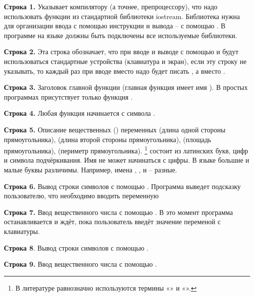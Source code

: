 \textbf{Строка 1.} Указывает компилятору (а точнее, препроцессору), что надо использовать функции из стандартной
библиотеки iostream. Библиотека  нужна для организации ввода с
помощью инструкции  и вывода – с помощью . В программе на языке  должны
быть подключены все используемые библиотеки.

\textbf{Строка 2.} Эта строка обозначает, что при вводе и выводе с помощью  и
 будут использоваться стандартные устройства (клавиатура и экран), если эту строку не указывать,
то каждый раз при вводе вместо  надо будет писать , а вместо
.

\textbf{Строка 3.} Заголовок главной функции (главная функция имеет имя ). В простых программах
присутствует только функция .

\textbf{Строка 4.} Любая функция начинается с символа \textstyleExample{\{}.

\textbf{Строка 5.} Описание вещественных () переменных  (длина одной стороны
прямоугольника),  (длина второй стороны прямоугольника),  (площадь
прямоугольника),  (периметр прямоугольника). \footnote{В 
литературе равнозначно используются термины «» и
«».} состоит из латинских букв, цифр и символа подчёркивания. Имя не может начинаться
с цифры. В языке  большие и малые буквы различимы. Например, имена ,
,  и  – разные.

\textbf{Строка 6.} Вывод строки символов  с помощью . Программа выведет
подсказку пользователю, что необходимо вводить переменную 

\textbf{Строка 7.} Ввод вещественного числа  с помощью . В это момент
программа останавливается и ждёт, пока пользователь введёт значение переменой  с клавиатуры.

\textbf{Строка 8}. Вывод строки символов  с помощью .

\textbf{Строка 9.} Ввод вещественного числа  с помощью .

